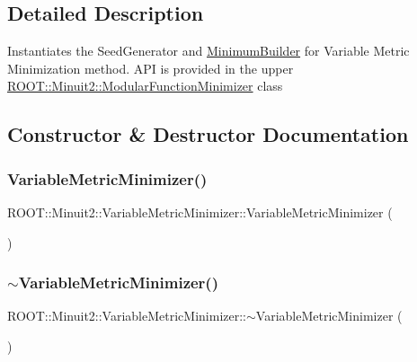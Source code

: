 \subsection{Detailed Description}
Instantiates the Seed\+Generator and \mbox{\hyperlink{classROOT_1_1Minuit2_1_1MinimumBuilder}{Minimum\+Builder}} for Variable Metric Minimization method. A\+PI is provided in the upper \mbox{\hyperlink{classROOT_1_1Minuit2_1_1ModularFunctionMinimizer}{R\+O\+O\+T\+::\+Minuit2\+::\+Modular\+Function\+Minimizer}} class 

\subsection{Constructor \& Destructor Documentation}
\mbox{\label{classROOT_1_1Minuit2_1_1VariableMetricMinimizer_a441dd894af1f9c01bd60d560260ee585}} 
\subsubsection{\texorpdfstring{VariableMetricMinimizer()}{VariableMetricMinimizer()}\hspace{0.1cm}{\footnotesize\ttfamily [1/3]}}
{\footnotesize\ttfamily R\+O\+O\+T\+::\+Minuit2\+::\+Variable\+Metric\+Minimizer\+::\+Variable\+Metric\+Minimizer (\begin{DoxyParamCaption}{ }\end{DoxyParamCaption})\hspace{0.3cm}{\ttfamily [inline]}}

\mbox{\label{classROOT_1_1Minuit2_1_1VariableMetricMinimizer_a2ccf4342c441f82eb4f57009ae69196e}} 
\subsubsection{\texorpdfstring{$\sim$VariableMetricMinimizer()}{~VariableMetricMinimizer()}\hspace{0.1cm}{\footnotesize\ttfamily [1/3]}}
{\footnotesize\ttfamily R\+O\+O\+T\+::\+Minuit2\+::\+Variable\+Metric\+Minimizer\+::$\sim$\+Variable\+Metric\+Minimizer (\begin{DoxyParamCaption}{ }\end{DoxyParamCaption})\hspace{0.3cm}{\ttfamily [inline]}}

